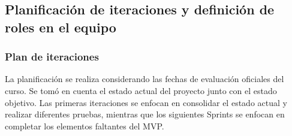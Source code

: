 \subsection{Planificación de iteraciones y definición de roles en el equipo}

\subsubsection{Plan de iteraciones}

La planificación se realiza considerando las fechas de evaluación oficiales del curso. Se tomó en cuenta el estado actual del proyecto junto con el estado objetivo. Las primeras iteraciones se enfocan en consolidar el estado actual y realizar diferentes pruebas, mientras que los siguientes Sprints se enfocan en completar los elementos faltantes del MVP.

